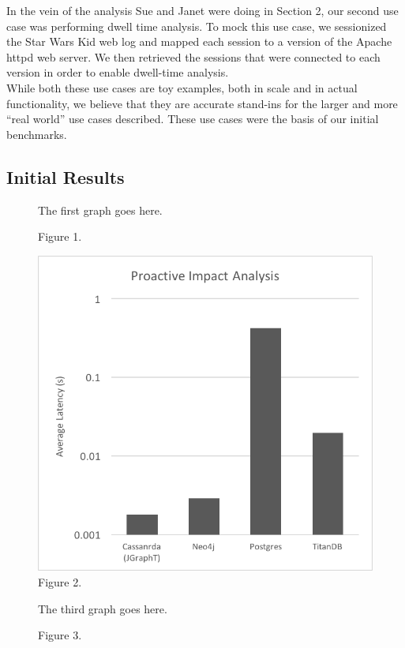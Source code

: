 \documentclass{sig-alternate}
\begin{document}
 In the vein of the analysis Sue and Janet were doing in Section 2, our second use case was performing dwell time analysis.
To mock this use case, we sessionized the Star Wars Kid web log and mapped each session to a version of the Apache httpd web server.
We then retrieved the sessions that were connected to each version in order to enable dwell-time analysis. 
\\

While both these use cases are toy examples, both in scale and in actual functionality, we believe that they are accurate stand-ins for the larger and more ``real world'' use cases described. These use cases were the basis of our initial benchmarks.

\subsection{Initial Results}
\begin{figure}
\vspace{1in}
The first graph goes here.
\vspace{1in}
\caption{Figure 1.}
\label{fig:fig1}
\end{figure}

\begin{figure}
\includegraphics[width=0.75\linewidth]{trans_closure.png}
\caption{Figure 2.}
\label{fig:fig2}
\end{figure}

\begin{figure}
\vspace{1in}
The third graph goes here.
\vspace{1in}
\caption{Figure 3.}
\label{fig:fig3}
\end{figure}
\end{document}
